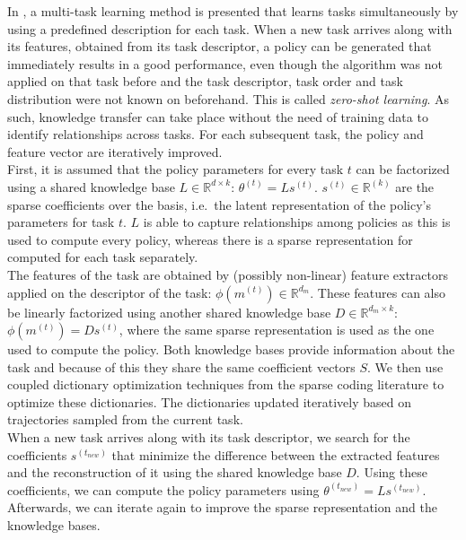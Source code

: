 In \cite{Isele2016UsingLearning}, a multi-task learning method is presented that learns tasks simultaneously by using a predefined description for each task.
When a new task arrives along with its features, obtained from its task descriptor, a policy can be generated that immediately results in a good performance, even though the algorithm was not applied on that task before and the task descriptor, task order and task distribution were not known on beforehand. This is called \textit{zero-shot learning}.
As such, knowledge transfer can take place without the need of training data to identify relationships across tasks.
For each subsequent task, the policy and feature vector are iteratively improved.\\
First, it is assumed that the policy parameters for every task $t$ can be factorized using a shared knowledge base $L \in \mathbb{R}^{d \times k}$: $\theta^{(t)} = Ls^{(t)}$. $s^{(t)} \in \mathbb{R}^{(k)}$ are the sparse coefficients over the basis, i.e.\ the latent representation of the policy's parameters for task $t$. $L$ is able to capture relationships among policies as this is used to compute every policy, whereas there is a sparse representation for computed for each task separately.\\
The features of the task are obtained by (possibly non-linear) feature extractors applied on the descriptor of the task: $\phi(m^{(t)}) \in \mathbb{R}^{d_m}$.
These features can also be linearly factorized using another shared knowledge base $D \in \mathbb{R}^{d_m \times k}$: $\phi(m^{(t)}) = Ds^{(t)}$, where the same sparse representation is used as the one used to compute the policy.
Both knowledge bases provide information about the task and because of this they share the same coefficient vectors $S$.
We then use coupled dictionary optimization techniques from the sparse coding literature to optimize these dictionaries.
The dictionaries updated iteratively based on trajectories sampled from the current task.\\
When a new task arrives along with its task descriptor, we search for the coefficients $s^{(t_{new})}$ that minimize the difference between the extracted features and the reconstruction of it using the shared knowledge base $D$.
Using these coefficients, we can compute the policy parameters using $\theta^{(t_{new})} = Ls^{(t_{new})}$. Afterwards, we can iterate again to improve the sparse representation and the knowledge bases.\\

